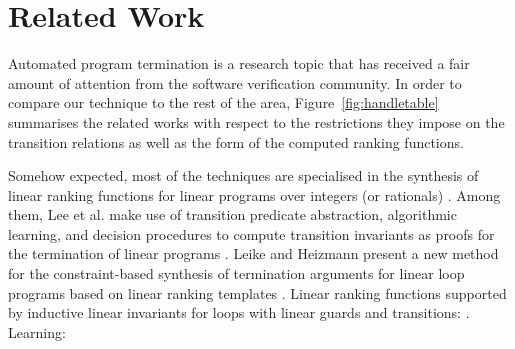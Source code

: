 \documentclass[preprint]{sigplanconf}
\theoremstyle{definition}
\begin{document}



\section{Related Work}
Automated program termination is a research topic that has received a fair amount of attention from the software verification community.
In order to compare our technique to the rest of the area, 
Figure~\ref{fig:handletable} summarises the related works with respect to the restrictions they impose on the transition relations as well as the form of the computed ranking functions. 


Somehow expected, most of the techniques are specialised in the synthesis of linear ranking functions for linear programs over integers (or rationals) \cite{DBLP:conf/pldi/CookPR06,DBLP:conf/cav/LeeWY12,DBLP:conf/popl/Ben-AmramG13,DBLP:conf/vmcai/P04,DBLP:conf/atva/HeizmannHLP13,DBLP:conf/cav/BradleyMS05,DBLP:conf/tacas/CookSZ13}. 
Among them, 
Lee et al. make use of transition predicate abstraction, algorithmic learning, and decision procedures to compute transition
invariants as proofs for the termination of linear programs \cite{DBLP:conf/cav/LeeWY12}.
Leike and Heizmann present a new method for the constraint-based synthesis
of termination arguments for linear loop programs based on
linear ranking templates \cite{DBLP:conf/tacas/LeikeH14}.
Linear ranking functions supported by inductive linear invariants for loops with linear guards and transitions: \cite{DBLP:conf/cav/BradleyMS05}. 
Learning: \cite{DBLP:journals/corr/HeizmannHP14}


\end{document}
